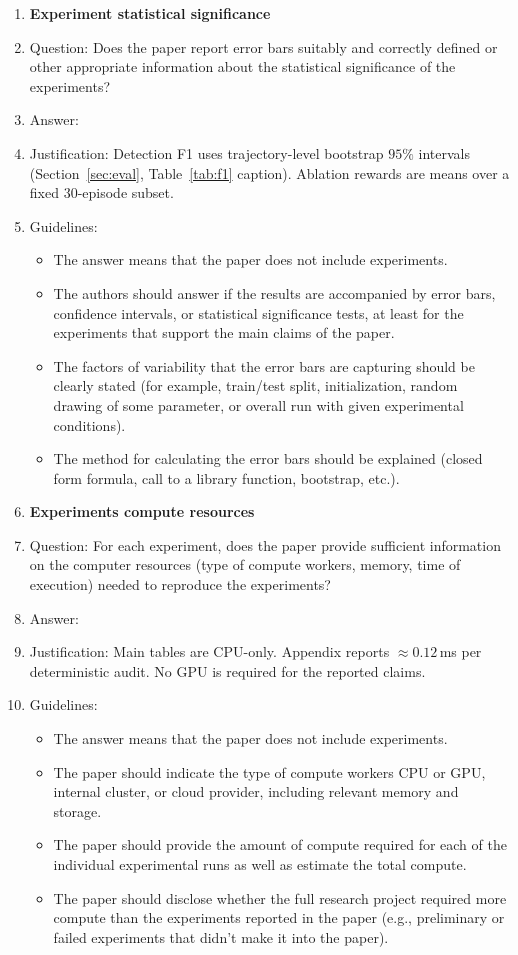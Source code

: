 \begin{enumerate}
\item {\bf Experiment statistical significance}
    \item[] Question: Does the paper report error bars suitably and correctly defined or other appropriate information about the statistical significance of the experiments?
    \item[] Answer: \answerYes{}
    \item[] Justification: Detection F1 uses trajectory-level bootstrap $95\%$ intervals (Section~\ref{sec:eval}, Table~\ref{tab:f1} caption). Ablation rewards are means over a fixed $30$-episode subset.
    \item[] Guidelines:
    \begin{itemize}
        \item The answer \answerNA{} means that the paper does not include experiments.
        \item The authors should answer \answerYes{} if the results are accompanied by error bars, confidence intervals, or statistical significance tests, at least for the experiments that support the main claims of the paper.
        \item The factors of variability that the error bars are capturing should be clearly stated (for example, train/test split, initialization, random drawing of some parameter, or overall run with given experimental conditions).
        \item The method for calculating the error bars should be explained (closed form formula, call to a library function, bootstrap, etc.).
    \end{itemize}

\item {\bf Experiments compute resources}
    \item[] Question: For each experiment, does the paper provide sufficient information on the computer resources (type of compute workers, memory, time of execution) needed to reproduce the experiments?
    \item[] Answer: \answerYes{}
    \item[] Justification: Main tables are CPU-only. Appendix reports $\approx 0.12$\,ms per deterministic audit. No GPU is required for the reported claims.
    \item[] Guidelines:
    \begin{itemize}
        \item The answer \answerNA{} means that the paper does not include experiments.
        \item The paper should indicate the type of compute workers CPU or GPU, internal cluster, or cloud provider, including relevant memory and storage.
        \item The paper should provide the amount of compute required for each of the individual experimental runs as well as estimate the total compute.
        \item The paper should disclose whether the full research project required more compute than the experiments reported in the paper (e.g., preliminary or failed experiments that didn't make it into the paper).
    \end{itemize}


\end{enumerate}
